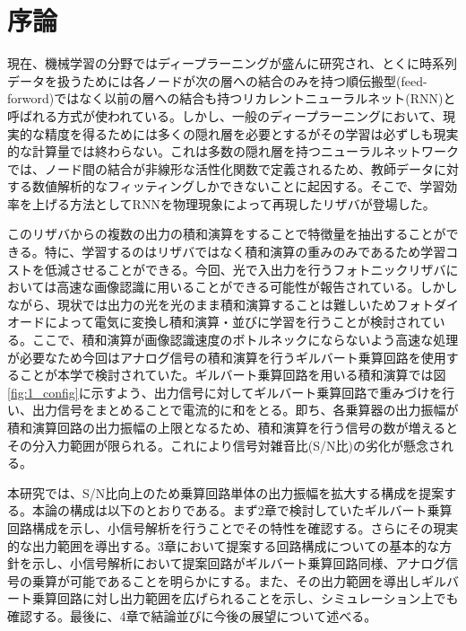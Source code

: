 \chapter{序論}
現在、機械学習の分野ではディープラーニングが盛んに研究され、とくに時系列データを扱うためには各ノードが次の層への結合のみを持つ順伝搬型(feed-forword)ではなく以前の層への結合も持つリカレントニューラルネット(RNN)と呼ばれる方式が使われている。しかし、一般のディープラーニングにおいて、現実的な精度を得るためには多くの隠れ層を必要とするがその学習は必ずしも現実的な計算量では終わらない。これは多数の隠れ層を持つニューラルネットワークでは、ノード間の結合が非線形な活性化関数で定義されるため、教師データに対する数値解析的なフィッティングしかできないことに起因する。そこで、学習効率を上げる方法としてRNNを物理現象によって再現したリザバが登場した。\par
このリザバからの複数の出力の積和演算をすることで特徴量を抽出することができる。特に、学習するのはリザバではなく積和演算の重みのみであるため学習コストを低減させることができる。今回、光で入出力を行うフォトニックリザバにおいては高速な画像認識に用いることができる可能性が報告されている。しかしながら、現状では出力の光を光のまま積和演算することは難しいためフォトダイオードによって電気に変換し積和演算・並びに学習を行うことが検討されている。ここで、積和演算が画像認識速度のボトルネックにならないよう高速な処理が必要なため今回はアナログ信号の積和演算を行うギルバート乗算回路を使用することが本学で検討されていた。ギルバート乗算回路を用いる積和演算では図\ref{fig:1_config}に示すよう、出力信号に対してギルバート乗算回路で重みづけを行い、出力信号をまとめることで電流的に和をとる。即ち、各乗算器の出力振幅が積和演算回路の出力振幅の上限となるため、積和演算を行う信号の数が増えるとその分入力範囲が限られる。これにより信号対雑音比(S/N比)の劣化が懸念される。\par
本研究では、S/N比向上のため乗算回路単体の出力振幅を拡大する構成を提案する。本論の構成は以下のとおりである。まず2章で検討していたギルバート乗算回路構成を示し、小信号解析を行うことでその特性を確認する。さらにその現実的な出力範囲を導出する。3章において提案する回路構成についての基本的な方針を示し、小信号解析において提案回路がギルバート乗算回路同様、アナログ信号の乗算が可能であることを明らかにする。また、その出力範囲を導出しギルバート乗算回路に対し出力範囲を広げられることを示し、シミュレーション上でも確認する。最後に、4章で結論並びに今後の展望について述べる。